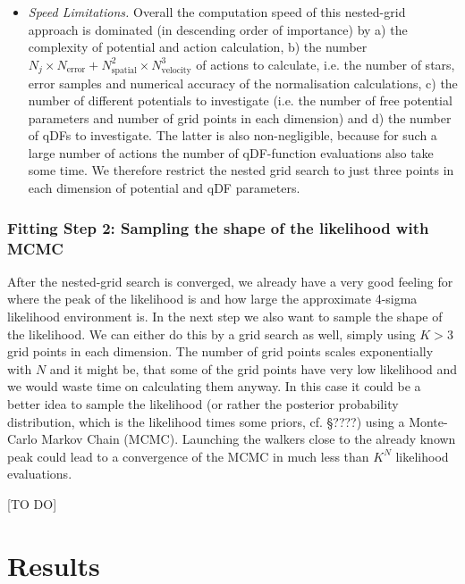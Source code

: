 \documentclass[12pt,preprint]{aastex}
\begin{document}
\begin{itemize}
\item \emph{Speed Limitations.} Overall the computation speed of this nested-grid approach is dominated (in descending order of importance) by a) the complexity of potential and action calculation, b) the number $N_j \times N_\text{error} + N_\text{spatial}^2 \times N_\text{velocity}^3$ of actions to calculate, i.e. the number of stars, error samples and numerical accuracy of the normalisation calculations, c) the number of different potentials to investigate (i.e. the number of free potential parameters and number of grid points in each dimension) and d) the number of qDFs to investigate. The latter is also non-negligible, because for such a large number of actions the number of  qDF-function evaluations also take some time. We therefore restrict the nested grid search to just three points in each dimension of potential and qDF parameters.
\end{itemize}

\subsubsection{Fitting Step 2: Sampling the shape of the likelihood with MCMC}

After the nested-grid search is converged, we already have a very good feeling for where the peak of the likelihood is and how large the approximate 4-sigma likelihood environment is. In the next step we also want to sample the shape of the likelihood. We can either do this by a grid search as well, simply using $K>3$ grid points in each dimension. The number of grid points scales exponentially with $N$ and it might be, that some of the grid points have very low likelihood and we would waste time on calculating them anyway. In this case it could be a better idea to sample the likelihood (or rather the posterior probability distribution, which is the likelihood times some priors, cf. \S ????) using a Monte-Carlo Markov Chain (MCMC). Launching the walkers close to the already known peak could lead to a convergence of the MCMC in much less than $K^N$ likelihood evaluations.

[TO DO]

\section{Results}
\end{document}
